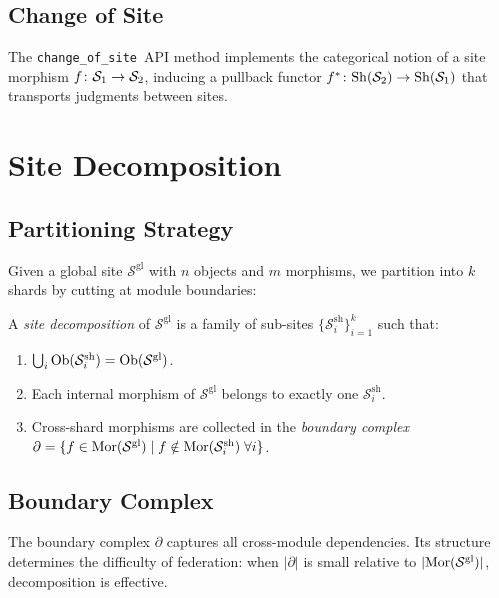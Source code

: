 \documentclass[11pt]{article}
\newcommand{\ShardSite}{\mathcal{S}^{\mathrm{sh}}}
\newcommand{\GlobalSite}{\mathcal{S}^{\mathrm{gl}}}
\newcommand{\ChangeOfSite}{\texttt{change\_of\_site}}
\begin{document}
\subsection{Change of Site}
The \ChangeOfSite\ API method implements the categorical notion of
a site morphism $f\colon \mathcal{S}_1 \to \mathcal{S}_2$, inducing a pullback
functor $f^*\colon \mathrm{Sh}(\mathcal{S}_2) \to \mathrm{Sh}(\mathcal{S}_1)$
that transports judgments between sites.

\section{Site Decomposition}\label{sec:decomposition}

\subsection{Partitioning Strategy}
Given a global site $\GlobalSite$ with $n$ objects and $m$ morphisms,
we partition into $k$ shards by cutting at module boundaries:

\begin{definition}\label{def:decomposition}
A \emph{site decomposition} of $\GlobalSite$ is a family of sub-sites
$\{\ShardSite_i\}_{i=1}^k$ such that:
\begin{enumerate}[noitemsep]
  \item $\bigcup_i \Ob(\ShardSite_i) = \Ob(\GlobalSite)$.
  \item Each internal morphism of $\GlobalSite$ belongs to exactly one
        $\ShardSite_i$.
  \item Cross-shard morphisms are collected in the \emph{boundary
        complex} $\partial = \{f \in \Mor(\GlobalSite) \mid
        f \notin \Mor(\ShardSite_i)\;\forall i\}$.
\end{enumerate}
\end{definition}

\subsection{Boundary Complex}
The boundary complex $\partial$ captures all cross-module dependencies.
Its structure determines the difficulty of federation: when $|\partial|$
is small relative to $|\Mor(\GlobalSite)|$, decomposition is effective.
\end{document}
